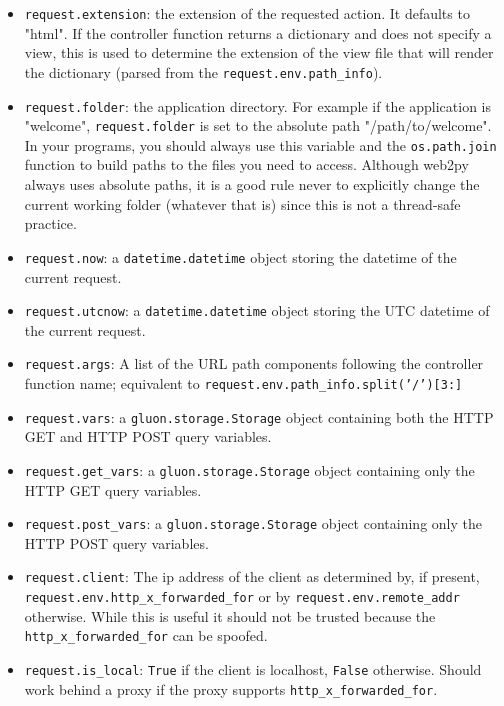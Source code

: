 \documentclass[justified,sixbynine,notoc]{tufte-book}
\def\ft{\small\tt}
\begin{document}
\begin{fullwidth}
\begin{itemize}
\item {\ft request.extension}: the extension of the requested action. It defaults to "html". If the controller function returns a dictionary and does not specify a view, this is used to determine the extension of the view file that will render the dictionary (parsed from the {\ft request.env.path\_info}).

\item {\ft request.folder}: the application directory. For example if the application is "welcome", {\ft request.folder} is set to the absolute path "/path/to/welcome". In your programs, you should always use this variable and the {\ft os.path.join} function to build paths to the files you need to access. Although web2py always uses absolute paths, it is a good rule never to explicitly  change the current working folder (whatever that is) since this is not a thread-safe practice.

\item {\ft request.now}: a {\ft datetime.datetime} object storing the datetime of the current request.

\item {\ft request.utcnow}: a {\ft datetime.datetime} object storing the UTC datetime of the current request.

\item {\ft request.args}: A list of the URL path components following the controller function name; equivalent to {\ft request.env.path\_info.split('/')[3:]}

\item {\ft request.vars}: a {\ft gluon.storage.Storage} object containing both the HTTP GET and HTTP POST query variables.

\item {\ft request.get\_vars}: a {\ft gluon.storage.Storage} object containing only the HTTP GET query variables.

\item {\ft request.post\_vars}: a {\ft gluon.storage.Storage} object containing only the HTTP POST query variables.

\item {\ft request.client}: The ip address of the client as determined by, if present, {\ft request.env.http\_x\_forwarded\_for} or by {\ft request.env.remote\_addr} otherwise. While this is useful it should not be trusted because the {\ft http\_x\_forwarded\_for} can be spoofed.

\item {\ft request.is\_local}: {\ft True} if the client is localhost, {\ft False} otherwise. Should work behind a proxy if the proxy supports {\ft http\_x\_forwarded\_for}.


\end{itemize}
\end{fullwidth}
\end{document}
